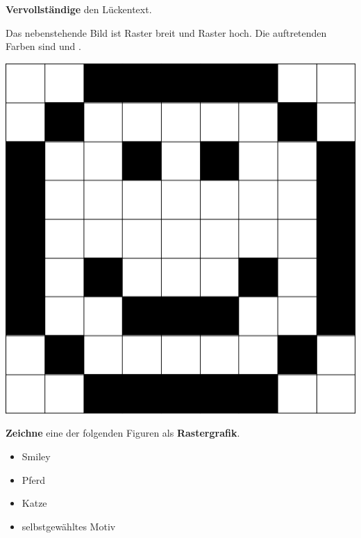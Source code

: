 \documentclass[a4paper, 12pt]{article}
\begin{document}
\TITEL
\vspace{-1cm}
\begin{LKtext}

\aufgabe{}
	\begin{minipage}{0.65\textwidth}\vspace{0pt}
	\textbf{Vervollständige} den Lückentext.
	
		Das nebenstehende Bild ist  Raster breit und  Raster hoch. Die auftretenden Farben sind \newline und .	
	\end{minipage}
	\hfill
	\begin{minipage}{0.25\textwidth}\vspace{0pt}
		\includegraphics[width=\linewidth]{A_1.png}
	\end{minipage}

\aufgabe{}
	\begin{minipage}{0.65\textwidth}\vspace{0pt}
		\textbf{Zeichne} eine der folgenden Figuren als \textbf{Rastergrafik}.

		\begin{itemize}
			\setlength\itemsep{-0.2em}
			\item Smiley
			\item Pferd
			\item Katze
			\item selbstgewähltes Motiv
		\end{itemize}


\end{minipage}
\end{LKtext}
\end{document}
